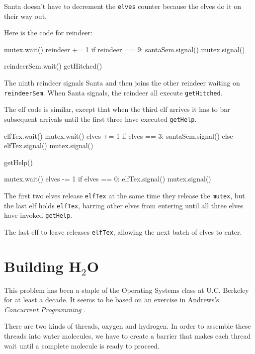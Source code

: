 \documentclass{book}
\begin{document}
Santa doesn't have to decrement
the {\tt elves} counter because the elves do it on their way
out.

Here is the code for reindeer:

\begin{unbreakable}[title={Santa problem solution (reindeer)}]{}
mutex.wait()
    reindeer += 1
    if reindeer == 9:
        santaSem.signal()
mutex.signal()

reindeerSem.wait()
getHitched()
\end{unbreakable}

The ninth reindeer signals Santa and then joins the other
reindeer waiting on {\tt reindeerSem}.  When Santa signals, the
reindeer all execute {\tt getHitched}.

The elf code is similar, except that when the third elf arrives
it has to bar subsequent arrivals until the first three have
executed {\tt getHelp}.


\begin{unbreakable}[title={Santa problem solution (elves)}]{}
elfTex.wait()
mutex.wait()
    elves += 1
    if elves == 3:
        santaSem.signal()
    else
        elfTex.signal()
mutex.signal()

getHelp()

mutex.wait()
    elves -= 1
    if elves == 0:
       elfTex.signal()
mutex.signal()
\end{unbreakable}

The first two elves release {\tt elfTex} at the same time they release
the {\tt mutex}, but the last elf holds {\tt elfTex}, barring other
elves from entering until all three elves have invoked {\tt getHelp}.

The last elf to leave releases {\tt elfTex}, allowing the
next batch of elves to enter.


\section{Building H$_2$O}
\label{water}

This problem has been a staple of the Operating Systems class
at U.C. Berkeley for at least a decade.  It seems to be based on
an exercise in Andrews's {\em Concurrent Programming} \cite{andrews}.

There are two kinds of threads, oxygen and hydrogen.  In order
to assemble these threads into water molecules, we have to
create a barrier that makes each thread wait until a
complete molecule is ready to proceed.
\end{document}
